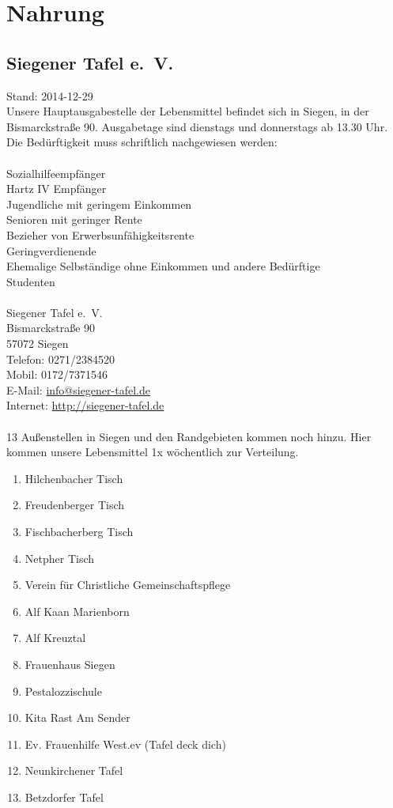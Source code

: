 \chapter{Nahrung}   

\section{Siegener Tafel e.~V.}   
Stand: 2014-12-29\\
Unsere Hauptausgabestelle der Lebensmittel befindet sich in Siegen, in der Bismarckstraße 90. Ausgabetage sind dienstags und donnerstags ab 13.30 Uhr. Die Bedürftigkeit muss schriftlich nachgewiesen werden:\\
\\
Sozialhilfeempfänger\\
Hartz IV Empfänger\\
Jugendliche mit geringem Einkommen\\
Senioren mit geringer Rente\\
Bezieher von Erwerbsunfähigkeitsrente\\
Geringverdienende\\
Ehemalige Selbständige ohne Einkommen und andere Bedürftige\\
Studenten\\
\\
Siegener Tafel e.~V.\\
Bismarckstraße 90\\
57072 Siegen\\
Telefon: 0271/2384520\\
Mobil: 0172/7371546\\
E-Mail: \href{mailto:info@siegener-tafel.de}{info@siegener-tafel.de}\\
Internet: \href{http://siegener-tafel.de}{http://siegener-tafel.de}\\
\\
13 Außenstellen in Siegen und den Randgebieten kommen noch hinzu. Hier kommen unsere Lebensmittel 1x wöchentlich zur Verteilung. 
\begin{enumerate}
	\item Hilchenbacher Tisch
	\item Freudenberger Tisch
	\item Fischbacherberg Tisch
	\item Netpher Tisch
	\item Verein für Christliche Gemeinschaftspflege
	\item Alf Kaan Marienborn
	\item Alf Kreuztal
	\item Frauenhaus Siegen
	\item Pestalozzischule
	\item Kita Rast Am Sender
	\item Ev. Frauenhilfe West.ev (Tafel deck dich)
	\item Neunkirchener Tafel
	\item Betzdorfer Tafel 
\end{enumerate}

